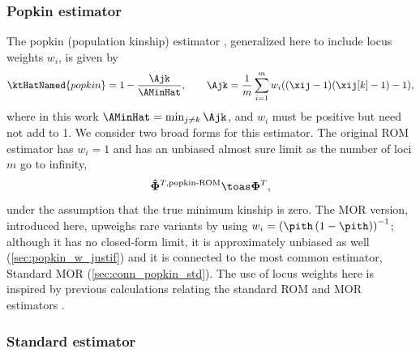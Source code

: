 \documentclass[11pt]{article}
\newcommand{\kinMat}[1][T]{%
  \ensuremath{%
    \mathbf{\Phi}^{#1}
  }%
  \xspace%
}%
\newcommand{\kinMatEstNamed}[1]{%
  \ensuremath{%
    \mathbf{\hat{\Phi}}^{T,\text{#1}}
  }%
  \xspace%
}%
\begin{document}
\subsubsection{Popkin estimator}

The popkin (population kinship) estimator \citep{ochoa_estimating_2021}, generalized here to include locus weights $w_i$, is given by
\begin{equation}
  \label{eq:popkin}
  \ktHatNamed{popkin}
  =
  1 - \frac{\Ajk}{\AMinHat}
  , \quad\quad
  \Ajk
  =
  \frac{1}{m} \sum_{i=1}^m w_i ( (\xij-1)(\xij[k]-1) - 1 )
  ,
\end{equation}
where in this work $\AMinHat = \min_{j \ne k} \Ajk$, and $w_i$ must be positive but need not add to 1.
We consider two broad forms for this estimator.
The original ROM estimator has $w_i = 1$ and has an unbiased almost sure limit as the number of loci $m$ go to infinity,
$$
\kinMatEstNamed{popkin-ROM} \toas \kinMat,
$$
under the assumption that the true minimum kinship is zero.
The MOR version, introduced here, upweighs rare variants by using $w_i = \left( \pith \left( 1 - \pith \right) \right)^{-1}$; although it has no closed-form limit, it is approximately unbiased as well (\cref{sec:popkin_w_justif}) and it is connected to the most common estimator, Standard MOR (\cref{sec:conn_popkin_std}). 
The use of locus weights here is inspired by previous calculations relating the standard ROM and MOR estimators \citep{wang_efficient_2017}.

\subsubsection{Standard estimator}
\end{document}
